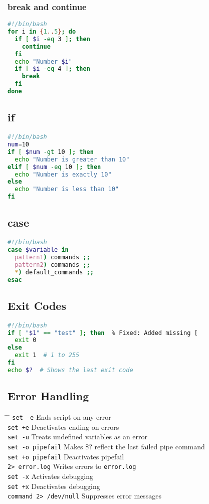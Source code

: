 \documentclass[a4paper,10pt]{article}
\begin{document}
\subsubsection*{break and continue}
\begin{lstlisting}[language=bash]
#!/bin/bash
for i in {1..5}; do
  if [ $i -eq 3 ]; then
    continue
  fi
  echo "Number $i"
  if [ $i -eq 4 ]; then
    break
  fi
done
\end{lstlisting}

\subsection{if}
\begin{lstlisting}[language=bash]
#!/bin/bash
num=10
if [ $num -gt 10 ]; then
  echo "Number is greater than 10"
elif [ $num -eq 10 ]; then
  echo "Number is exactly 10"
else
  echo "Number is less than 10"
fi
\end{lstlisting}

\subsection{case}
\begin{lstlisting}[language=bash]
#!/bin/bash
case $variable in
  pattern1) commands ;; 
  pattern2) commands ;; 
  *) default_commands ;;
esac
\end{lstlisting}

\subsection{Exit Codes}
\begin{lstlisting}[language=bash]
#!/bin/bash
if [ "$1" == "test" ]; then  % Fixed: Added missing [
  exit 0 
else 
  exit 1  # 1 to 255
fi
echo $?  # Shows the last exit code
\end{lstlisting}

\subsection{Error Handling}
\begin{tabbing}
	\= \hspace{30mm} \= \hspace{50mm} \kill
	\> \verb|set -e| \> Ends script on any error \\
	\> \verb|set +e| \> Deactivates ending on errors \\
	\> \verb|set -u| \> Treats undefined variables as an error \\
	\> \verb|set -o pipefail| \> Makes \$? reflect the last failed pipe command \\
	\> \verb|set +o pipefail| \> Deactivates pipefail \\
	\> \verb|2> error.log| \> Writes errors to \verb|error.log| \\
	\> \verb|set -x| \> Activates debugging \\
	\> \verb|set +x| \> Deactivates debugging \\
	\> \verb|command 2> /dev/null| \> Suppresses error messages \\
\end{tabbing}
\end{document}
